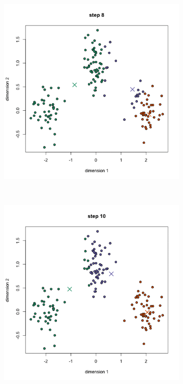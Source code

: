 \documentclass[a4paper, 14pt]{extarticle}
\begin{document}
\begin{figure}[h]
	\begin{subfigure}[b]{0.3\textwidth}
		\includegraphics[width=\textwidth]{k_3}
		\caption{}
	\end{subfigure}
	~
	\begin{subfigure}[b]{0.3\textwidth}
		\includegraphics[width=\textwidth]{k_4}

\end{subfigure}
\end{figure}
\end{document}
